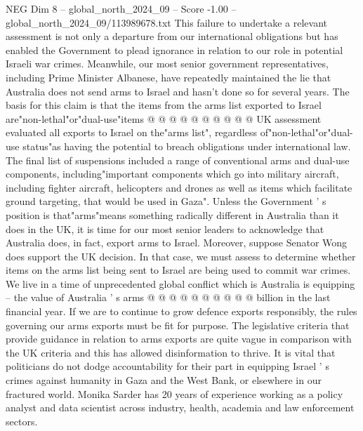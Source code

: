 \begin{textsample}{NEG Dim 8 – global\_north\_2024\_09 – Score -1.00 – global\_north\_2024\_09/113989678.txt}
This failure to undertake a relevant assessment is not only a departure from our international obligations but has enabled the Government to plead ignorance in relation to our role in potential Israeli war crimes.
Meanwhile, our most senior government representatives, including Prime Minister Albanese, have repeatedly maintained the lie that Australia does not send arms to Israel and hasn't done so for several years.
The basis for this claim is that the items from the arms list exported to Israel are"non-lethal"or"dual-use"items @ @ @ @ @ @ @ @ @ @ UK assessment evaluated all exports to Israel on the"arms list", regardless of"non-lethal"or"dual-use status"as having the potential to breach obligations under international law.
The final list of suspensions included a range of conventional arms and dual-use components, including"important components which go into military aircraft, including fighter aircraft, helicopters and drones as well as items which facilitate ground targeting, that would be used in Gaza".
Unless the Government ' s position is that"arms"means something radically different in Australia than it does in the UK, it is time for our most senior leaders to acknowledge that Australia does, in fact, export arms to Israel.
Moreover, suppose Senator Wong does support the UK decision.
In that case, we must assess to determine whether items on the arms list being sent to Israel are being used to commit war crimes.
We live in a time of unprecedented global conflict which is Australia is equipping -- the value of Australia ' s arms @ @ @ @ @ @ @ @ @ @ billion in the last financial year.
If we are to continue to grow defence exports responsibly, the rules governing our arms exports must be fit for purpose.
The legislative criteria that provide guidance in relation to arms exports are quite vague in comparison with the UK criteria and this has allowed disinformation to thrive.
It is vital that politicians do not dodge accountability for their part in equipping Israel ' s crimes against humanity in Gaza and the West Bank, or elsewhere in our fractured world.
Monika Sarder has 20 years of experience working as a policy analyst and data scientist across industry, health, academia and law enforcement sectors.

\end{textsample}
